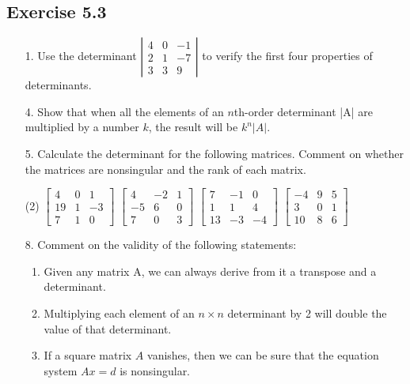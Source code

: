 \documentclass{./../../Latex/homework}
\begin{document}
\thispagestyle{plain}
\newcommand{\mytitle}{Homework 4 Problems}
\myheader{\mytitle}

\subsection*{Exercise 5.3}

\begin{enumerate}

\item[1.] Use the determinant $\left|\begin{array}{rrr}4 & 0 & -1 \\ 2 & 1 & -7 \\ 3 & 3 & 9\end{array}\right|$ to verify the first four properties of determinants.

\item[4.] Show that when all the elements of an $n$th-order determinant |A| are multiplied by a number $k$, the result will be $k^{n}|A|$.

\item[5.] Calculate the determinant for the following matrices. Comment on whether the matrices are nonsingular and the rank of each matrix.
\begin{tasks}(2)
\task $\left[\begin{array}{rrr}4 & 0 & 1 \\ 19 & 1 & -3 \\ 7 & 1 & 0\end{array}\right]$
\task $\left[\begin{array}{rrr}4 & -2 & 1 \\ -5 & 6 & 0 \\ 7 & 0 & 3\end{array}\right]$
\task $\left[\begin{array}{rrr}7 & -1 & 0 \\ 1 & 1 & 4 \\ 13 & -3 & -4\end{array}\right]$
\task $\left[\begin{array}{rrr}-4 & 9 & 5 \\ 3 & 0 & 1 \\ 10 & 8 & 6\end{array}\right]$	
\end{tasks}

\item[8.] Comment on the validity of the following statements:
\begin{enumerate}
\item Given any matrix A, we can always derive from it a transpose and a determinant.
\item Multiplying each element of an $n \times n$ determinant by 2 will double the value of that determinant.
\item If a square matrix $A$ vanishes, then we can be sure that the equation system $A x=d$ is nonsingular.
\end{enumerate}
\end{enumerate}
\end{document}
